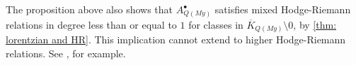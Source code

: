 \begin{remark}
    The proposition above also shows that $A^\bullet_{Q(My)}$ satisfies mixed Hodge-Riemann relations in degree less than or equal to $1$ for classes in $\overline K_{Q(My)}\setminus 0$, by \cref{thm: lorentzian and HR}. This implication cannot extend to higher Hodge-Riemann relations. See \cite[Example 6.17]{NW26}, for example.
\end{remark}

